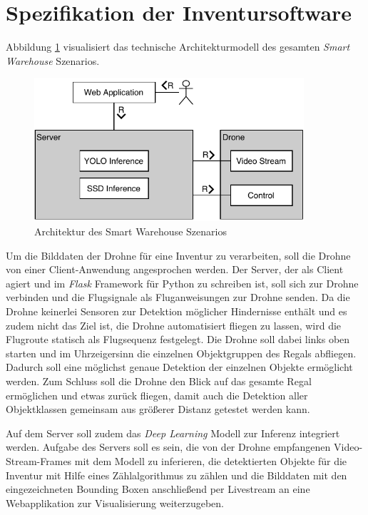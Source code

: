 \section{Spezifikation der Inventursoftware} \label{software}

Abbildung \ref{tam} visualisiert das technische Architekturmodell des gesamten \textit{Smart Warehouse} Szenarios.

\begin{figure}[H]
	\begin{center}
		\includegraphics[width=10cm]{Bilder/tam.pdf}
		\caption[Architektur des Smart Warehouse Szenarios]{Architektur des Smart Warehouse Szenarios}
		\label{tam}
	\end{center}
\end{figure}

Um die Bilddaten der Drohne für eine Inventur zu verarbeiten, soll die Drohne von einer Client-Anwendung angesprochen werden. Der Server, der als Client agiert und im \textit{Flask} Framework für Python zu schreiben ist, soll sich zur Drohne verbinden und die Flugsignale als Fluganweisungen zur Drohne senden. Da die Drohne keinerlei Sensoren zur Detektion möglicher Hindernisse enthält und es zudem nicht das Ziel ist, die Drohne automatisiert fliegen zu lassen, wird die Flugroute statisch als Flugsequenz festgelegt. Die Drohne soll dabei links oben starten und im Uhrzeigersinn die einzelnen Objektgruppen des Regals abfliegen. Dadurch soll eine möglichst genaue Detektion der einzelnen Objekte ermöglicht werden. Zum Schluss soll die Drohne den Blick auf das gesamte Regal ermöglichen und etwas zurück fliegen, damit auch die Detektion aller Objektklassen gemeinsam aus größerer Distanz getestet werden kann.

Auf dem Server soll zudem das \textit{Deep Learning} Modell zur Inferenz integriert werden. Aufgabe des Servers soll es sein, die von der Drohne empfangenen Video-Stream-Frames mit dem Modell zu inferieren, die detektierten Objekte für die Inventur mit Hilfe eines Zählalgorithmus zu zählen und die Bilddaten mit den eingezeichneten Bounding Boxen anschließend per Livestream an eine Webapplikation zur Visualisierung weiterzugeben. 

